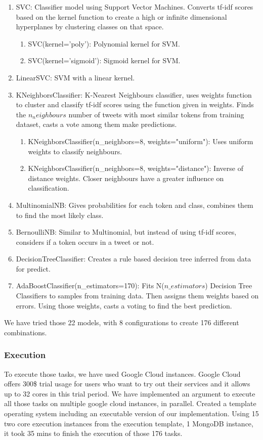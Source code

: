 \documentclass[twoside,11pt]{article}
\begin{document}
\begin{enumerate}
\item SVC: Classifier model using Support Vector Machines. Converts tf-idf scores based on the kernel function to create a high or infinite dimensional hyperplanes by clustering classes on that space.
\begin{enumerate}
\item SVC(kernel='poly'): Polynomial kernel for SVM.
\item SVC(kernel='sigmoid'): Sigmoid kernel for SVM.
\end{enumerate}
\item LinearSVC: SVM with a linear kernel.
\item KNeighborsClassifier: K-Nearest Neighbours classifier, uses weights function to cluster and classify tf-idf scores using the function given in weights. Finds the $n_neighbours$ number of tweets with most similar tokens from training dataset, casts a vote among them make predictions.
\begin{enumerate}
\item KNeighborsClassifier(n\_neighbors=8, weights="uniform"): Uses uniform weights to classify neighbours.
\item KNeighborsClassifier(n\_neighbors=8, weights="distance"): Inverse of distance weights. Closer neighbours have a greater influence on classification.
\end{enumerate}
\item MultinomialNB: Gives probabilities for each token and class, combines them to find the most likely class.
\item BernoulliNB: Similar to Multinomial, but instead of using tf-idf scores, considers if a token occurs in a tweet or not.
\item DecisionTreeClassifier: Creates a rule based decision tree inferred from data for predict.
\item AdaBoostClassifier(n\_estimators=170): Fits N($n\_estimators$) Decision Tree Classifiers to samples from training data. Then assigns them weights based on errors. Using those weights, casts a voting to find the best prediction.
\end{enumerate}
\normalsize
We have tried those 22 models, with 8 configurations to create 176 different combinations.

\subsubsection{Execution}

To execute those tasks, we have used Google Cloud instances. Google Cloud offers 300\$ trial usage for users who want to try out their services and it allows up to 32 cores in this trial period. We have implemented an argument to execute all those tasks on multiple google cloud instances, in parallel. Created a template operating system including an executable version of our implementation. Using 15 two core execution instances from the execution template, 1 MongoDB instance, it took 35 mins to finish the execution of those 176 tasks. 
\end{document}
